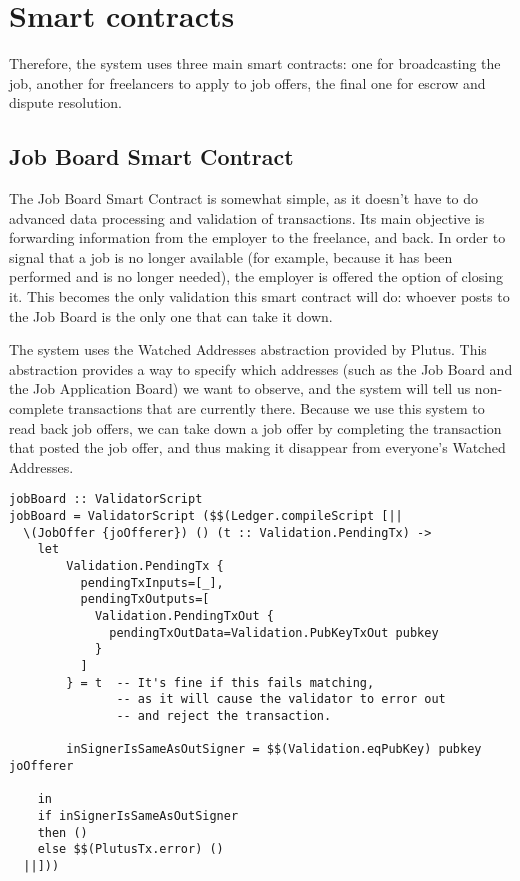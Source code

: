 \documentclass{article}
\begin{document}
\section{Smart contracts}
Therefore, the system uses three main smart contracts: one for broadcasting the job, another for freelancers to apply to job offers, the final one for escrow and dispute resolution.

\subsection{Job Board Smart Contract}
The Job Board Smart Contract is somewhat simple, as it doesn't have to do advanced data processing and validation of transactions. Its main objective is forwarding information from the employer to the freelance, and back. In order to signal that a job is no longer available (for example, because it has been performed and is no longer needed), the employer is offered the option of closing it. This becomes the only validation this smart contract will do: whoever posts to the Job Board is the only one that can take it down.

The system uses the Watched Addresses abstraction provided by Plutus. This abstraction provides a way to specify which addresses (such as the Job Board and the Job Application Board) we want to observe, and the system will tell us non-complete transactions that are currently there. Because we use this system to read back job offers, we can take down a job offer by completing the transaction that posted the job offer, and thus making it disappear from everyone's Watched Addresses.

\begin{samepage}
\begin{verbatim}
jobBoard :: ValidatorScript
jobBoard = ValidatorScript ($$(Ledger.compileScript [||
  \(JobOffer {joOfferer}) () (t :: Validation.PendingTx) ->
    let
        Validation.PendingTx {
          pendingTxInputs=[_],
          pendingTxOutputs=[
            Validation.PendingTxOut {
              pendingTxOutData=Validation.PubKeyTxOut pubkey
            }
          ]
        } = t  -- It's fine if this fails matching,
               -- as it will cause the validator to error out
               -- and reject the transaction.

        inSignerIsSameAsOutSigner = $$(Validation.eqPubKey) pubkey joOfferer

    in
    if inSignerIsSameAsOutSigner
    then ()
    else $$(PlutusTx.error) ()
  ||]))
\end{verbatim}
\end{samepage}
\end{document}
